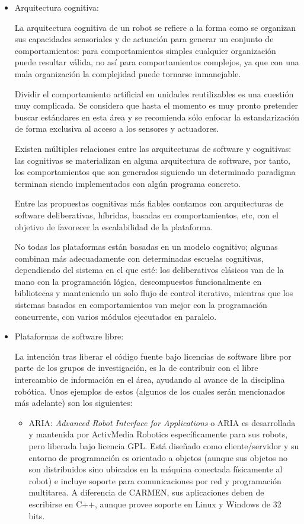 \begin{itemize}
	\item Arquitectura cognitiva:

	La arquitectura cognitiva de un robot se refiere a la forma como se organizan sus capacidades sensoriales y de actuación para generar un conjunto de comportamientos: para comportamientos simples cualquier organización puede resultar válida, no así para comportamientos complejos, ya que con una mala organización la complejidad puede tornarse inmanejable.

	Dividir el comportamiento artificial en unidades reutilizables es una cuestión muy complicada. Se considera que hasta el momento es muy pronto pretender buscar estándares en esta área y se recomienda sólo enfocar la estandarización de forma exclusiva al acceso a los sensores y actuadores.

	Existen múltiples relaciones entre las arquitecturas de software y cognitivas: las cognitivas se materializan en alguna arquitectura de software, por tanto, los comportamientos que son generados siguiendo un determinado paradigma terminan siendo implementados con algún programa concreto.

	Entre las propuestas cognitivas más fiables contamos con arquitecturas de software deliberativas, híbridas, basadas en comportamientos, etc, con el objetivo de favorecer la escalabilidad de la plataforma.

	No todas las plataformas están basadas en un modelo cognitivo; algunas combinan más adecuadamente con determinadas escuelas cognitivas, dependiendo del sistema en el que esté: los deliberativos clásicos van de la mano con la programación lógica, descompuestos funcionalmente en bibliotecas y manteniendo un solo flujo de control iterativo, mientras que los sistemas basados en comportamientos van mejor con la programación concurrente, con varios módulos ejecutados en paralelo.

	\item Plataformas de software libre:

	La intención tras liberar el código fuente bajo licencias de software libre por parte de los grupos de investigación, es la de contribuir con el libre intercambio de información en el área, ayudando al avance de la disciplina robótica. Unos ejemplos de estos (algunos de los cuales serán mencionados más adelante) son los siguientes:

	\begin{itemize}
		\item ARIA: \textit{Advanced Robot Interface for Applications} o ARIA es desarrollada y mantenida por ActivMedia Robotics específicamente para sus robots, pero liberada bajo licencia GPL. Está diseñado como cliente/servidor y su entorno de programación es orientado a objetos (aunque sus objetos no son distribuidos sino ubicados en la máquina conectada físicamente al robot) e incluye soporte para comunicaciones por red y programación multitarea. A diferencia de CARMEN, sus aplicaciones deben de escribirse en C++, aunque provee soporte en Linux y Windows de 32 bits.


\end{itemize}
\end{itemize}
